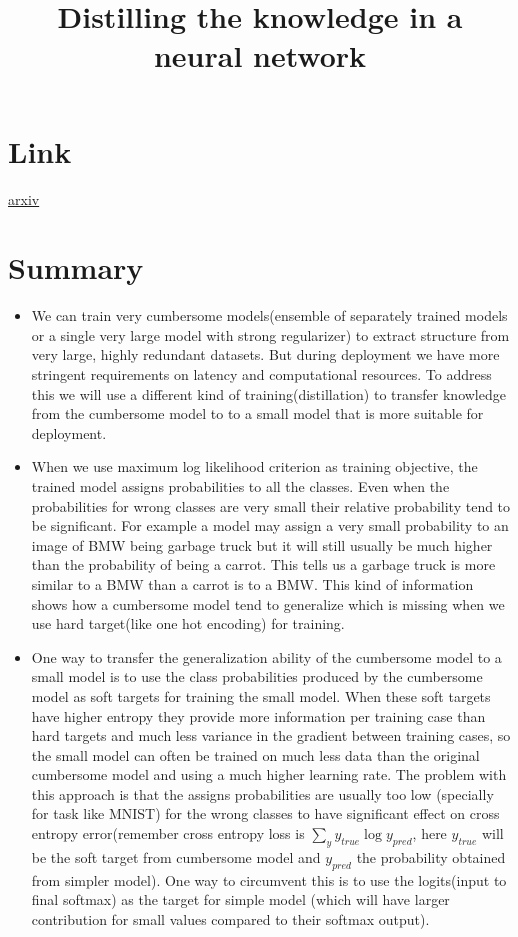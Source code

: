 \documentclass{article}
\title{Distilling the knowledge in a neural network}
\author{}
\date{}
\begin{document}
\maketitle

\section*{Link}
\href{https://arxiv.org/abs/1503.02531}{arxiv} 

\section*{Summary}
\begin{itemize}
    \item We can train very cumbersome models(ensemble of separately trained models or a single very large model with strong regularizer) to extract structure from very large, highly redundant datasets. But during deployment we have more stringent requirements on latency and computational resources. To address this we will use a different kind of training(distillation) to transfer knowledge from the cumbersome model to to a small model that is more suitable for deployment. 
    \item When we use maximum log likelihood criterion as training objective, the trained model assigns probabilities to all the classes. Even when the probabilities for wrong classes are very small their relative probability tend to be significant. For example a model may assign a very small probability to an image of BMW being garbage truck but it will still usually be much higher than the probability of being a carrot. This tells us a garbage truck is more similar to a BMW than a carrot is to a BMW. This kind of information shows how a cumbersome model tend to generalize which is missing when we use hard target(like one hot encoding) for training.
    \item One way to transfer the generalization ability of the cumbersome model to a small model is to use the class probabilities produced by the cumbersome model as soft targets for training the small model. When these soft targets have higher entropy they provide more information per training case than hard targets and much less variance in the gradient between training cases, so the small model can often be trained on much less data than the original cumbersome model and using a much higher learning rate. The problem with this approach is that the assigns probabilities are usually too low (specially for task like MNIST) for the wrong classes to have significant effect on cross entropy error(remember cross entropy loss is $\sum_{y} y_{true} \log y_{pred}$, here $y_{true}$ will be the soft target from cumbersome model and $y_{pred}$ the probability obtained from simpler model). One way to circumvent this is to use the logits(input to final softmax) as the target for simple model (which will have larger contribution for small values compared to their softmax output).  

\end{itemize}
\end{document}

